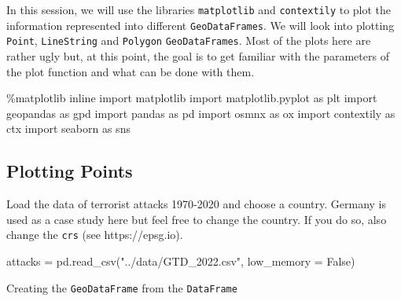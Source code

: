 \documentclass[
  letterpaper,
  DIV=11,
  numbers=noendperiod]{scrreprt}
\newenvironment{Shaded}{\begin{snugshade}}{\end{snugshade}}
\newcommand{\ImportTok}[1]{\textcolor[rgb]{0.00,0.46,0.62}{#1}}
\newcommand{\NormalTok}[1]{\textcolor[rgb]{0.00,0.23,0.31}{#1}}
\newcommand{\OperatorTok}[1]{\textcolor[rgb]{0.37,0.37,0.37}{#1}}
\newcommand{\StringTok}[1]{\textcolor[rgb]{0.13,0.47,0.30}{#1}}
\newcommand{\VariableTok}[1]{\textcolor[rgb]{0.07,0.07,0.07}{#1}}
\begin{document}
In this session, we will use the libraries \texttt{matplotlib} and
\texttt{contextily} to plot the information represented into different
\texttt{GeoDataFrames}. We will look into plotting \texttt{Point},
\texttt{LineString} and \texttt{Polygon} \texttt{GeoDataFrames}. Most of
the plots here are rather ugly but, at this point, the goal is to get
familiar with the parameters of the plot function and what can be done
with them.

\begin{Shaded}
\begin{Highlighting}[]
\OperatorTok{\%}\NormalTok{matplotlib inline}
\ImportTok{import}\NormalTok{ matplotlib}
\ImportTok{import}\NormalTok{ matplotlib.pyplot }\ImportTok{as}\NormalTok{ plt}
\ImportTok{import}\NormalTok{ geopandas }\ImportTok{as}\NormalTok{ gpd}
\ImportTok{import}\NormalTok{ pandas }\ImportTok{as}\NormalTok{ pd}
\ImportTok{import}\NormalTok{ osmnx }\ImportTok{as}\NormalTok{ ox}
\ImportTok{import}\NormalTok{ contextily }\ImportTok{as}\NormalTok{ ctx}
\ImportTok{import}\NormalTok{ seaborn }\ImportTok{as}\NormalTok{ sns}
\end{Highlighting}
\end{Shaded}

\subsection{Plotting Points}\label{plotting-points}

Load the data of terrorist attacks 1970-2020 and choose a country.
Germany is used as a case study here but feel free to change the
country. If you do so, also change the \texttt{crs} (see
https://epsg.io).

\begin{Shaded}
\begin{Highlighting}[]
\NormalTok{attacks }\OperatorTok{=}\NormalTok{ pd.read\_csv(}\StringTok{"../data/GTD\_2022.csv"}\NormalTok{, low\_memory }\OperatorTok{=} \VariableTok{False}\NormalTok{)}
\end{Highlighting}
\end{Shaded}

Creating the \texttt{GeoDataFrame} from the \texttt{DataFrame}
\end{document}
